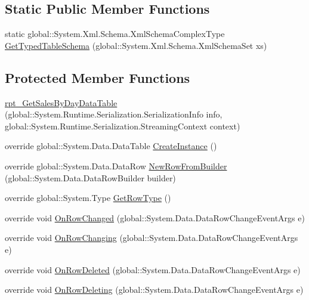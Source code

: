 \subsection*{Static Public Member Functions}
\begin{DoxyCompactItemize}
\item 
static global\+::\+System.\+Xml.\+Schema.\+Xml\+Schema\+Complex\+Type \hyperlink{classprj_progra_i_i_i_1_1_prj_progra_i_i_i_data_set_1_1rpt___get_sales_by_day_data_table_aa810ec728b5c4bff390868aab376d9ea}{Get\+Typed\+Table\+Schema} (global\+::\+System.\+Xml.\+Schema.\+Xml\+Schema\+Set xs)
\end{DoxyCompactItemize}
\subsection*{Protected Member Functions}
\begin{DoxyCompactItemize}
\item 
\hyperlink{classprj_progra_i_i_i_1_1_prj_progra_i_i_i_data_set_1_1rpt___get_sales_by_day_data_table_ad442bf7f27bdd0f8ba22d80e32aa9665}{rpt\+\_\+\+Get\+Sales\+By\+Day\+Data\+Table} (global\+::\+System.\+Runtime.\+Serialization.\+Serialization\+Info info, global\+::\+System.\+Runtime.\+Serialization.\+Streaming\+Context context)
\item 
override global\+::\+System.\+Data.\+Data\+Table \hyperlink{classprj_progra_i_i_i_1_1_prj_progra_i_i_i_data_set_1_1rpt___get_sales_by_day_data_table_a6c1dc206c680402843dbbe9744a240ed}{Create\+Instance} ()
\item 
override global\+::\+System.\+Data.\+Data\+Row \hyperlink{classprj_progra_i_i_i_1_1_prj_progra_i_i_i_data_set_1_1rpt___get_sales_by_day_data_table_a363d9811719bbf2c764baff0b125c964}{New\+Row\+From\+Builder} (global\+::\+System.\+Data.\+Data\+Row\+Builder builder)
\item 
override global\+::\+System.\+Type \hyperlink{classprj_progra_i_i_i_1_1_prj_progra_i_i_i_data_set_1_1rpt___get_sales_by_day_data_table_a1d93f2fc1d404a0b58348171b5a8b19e}{Get\+Row\+Type} ()
\item 
override void \hyperlink{classprj_progra_i_i_i_1_1_prj_progra_i_i_i_data_set_1_1rpt___get_sales_by_day_data_table_ac2105aaa9aaef5a61fbb005451805263}{On\+Row\+Changed} (global\+::\+System.\+Data.\+Data\+Row\+Change\+Event\+Args e)
\item 
override void \hyperlink{classprj_progra_i_i_i_1_1_prj_progra_i_i_i_data_set_1_1rpt___get_sales_by_day_data_table_a36dbbf76549bb09b51e5a989a0e7981d}{On\+Row\+Changing} (global\+::\+System.\+Data.\+Data\+Row\+Change\+Event\+Args e)
\item 
override void \hyperlink{classprj_progra_i_i_i_1_1_prj_progra_i_i_i_data_set_1_1rpt___get_sales_by_day_data_table_a572ee27d582cfe2e1f1a66d505a78f0f}{On\+Row\+Deleted} (global\+::\+System.\+Data.\+Data\+Row\+Change\+Event\+Args e)
\item 
override void \hyperlink{classprj_progra_i_i_i_1_1_prj_progra_i_i_i_data_set_1_1rpt___get_sales_by_day_data_table_ad894b9b9c84b5aefb3d1e083e7a287d3}{On\+Row\+Deleting} (global\+::\+System.\+Data.\+Data\+Row\+Change\+Event\+Args e)
\end{DoxyCompactItemize}
